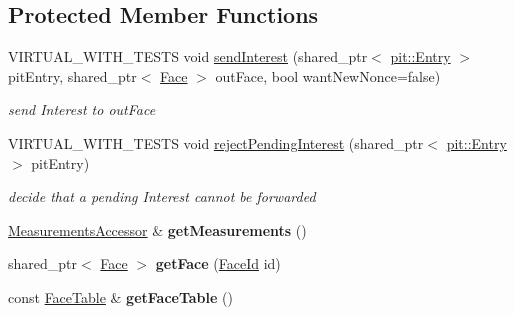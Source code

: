 \subsection*{Protected Member Functions}
\begin{DoxyCompactItemize}
\item 
V\+I\+R\+T\+U\+A\+L\+\_\+\+W\+I\+T\+H\+\_\+\+T\+E\+S\+TS void \hyperlink{classnfd_1_1fw_1_1Strategy_a26b163c5f916a87613d60c8782a9441e}{send\+Interest} (shared\+\_\+ptr$<$ \hyperlink{classnfd_1_1pit_1_1Entry}{pit\+::\+Entry} $>$ pit\+Entry, shared\+\_\+ptr$<$ \hyperlink{classnfd_1_1Face}{Face} $>$ out\+Face, bool want\+New\+Nonce=false)\hypertarget{classnfd_1_1fw_1_1Strategy_a26b163c5f916a87613d60c8782a9441e}{}\label{classnfd_1_1fw_1_1Strategy_a26b163c5f916a87613d60c8782a9441e}

\begin{DoxyCompactList}\small\item\em send Interest to out\+Face \end{DoxyCompactList}\item 
V\+I\+R\+T\+U\+A\+L\+\_\+\+W\+I\+T\+H\+\_\+\+T\+E\+S\+TS void \hyperlink{classnfd_1_1fw_1_1Strategy_a68d59f8d093499bac742fdf4da66d161}{reject\+Pending\+Interest} (shared\+\_\+ptr$<$ \hyperlink{classnfd_1_1pit_1_1Entry}{pit\+::\+Entry} $>$ pit\+Entry)
\begin{DoxyCompactList}\small\item\em decide that a pending Interest cannot be forwarded \end{DoxyCompactList}\item 
\hyperlink{classnfd_1_1MeasurementsAccessor}{Measurements\+Accessor} \& {\bfseries get\+Measurements} ()\hypertarget{classnfd_1_1fw_1_1Strategy_abdb817c46612323433203a534da2db7d}{}\label{classnfd_1_1fw_1_1Strategy_abdb817c46612323433203a534da2db7d}

\item 
shared\+\_\+ptr$<$ \hyperlink{classnfd_1_1Face}{Face} $>$ {\bfseries get\+Face} (\hyperlink{classFaceId}{Face\+Id} id)\hypertarget{classnfd_1_1fw_1_1Strategy_abc29c9c81d4870d581045223d3c95577}{}\label{classnfd_1_1fw_1_1Strategy_abc29c9c81d4870d581045223d3c95577}

\item 
const \hyperlink{classnfd_1_1FaceTable}{Face\+Table} \& {\bfseries get\+Face\+Table} ()\hypertarget{classnfd_1_1fw_1_1Strategy_a97032472ff73617d6b124667da7856e3}{}\label{classnfd_1_1fw_1_1Strategy_a97032472ff73617d6b124667da7856e3}

\end{DoxyCompactItemize}
